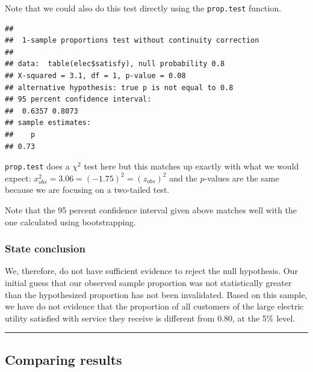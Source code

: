 \documentclass[]{tufte-book}
\newenvironment{Shaded}{\begin{snugshade}}{\end{snugshade}}
\newcommand{\KeywordTok}[1]{\textcolor[rgb]{0.13,0.29,0.53}{\textbf{{#1}}}}
\newcommand{\DataTypeTok}[1]{\textcolor[rgb]{0.13,0.29,0.53}{{#1}}}
\newcommand{\FloatTok}[1]{\textcolor[rgb]{0.00,0.00,0.81}{{#1}}}
\newcommand{\StringTok}[1]{\textcolor[rgb]{0.31,0.60,0.02}{{#1}}}
\newcommand{\OtherTok}[1]{\textcolor[rgb]{0.56,0.35,0.01}{{#1}}}
\newcommand{\NormalTok}[1]{{#1}}
\let\oldrule=\rule
\renewcommand{\rule}[1]{\oldrule{\linewidth}}
\begin{document}
Note that we could also do this test directly using the
\texttt{prop.test} function.

\begin{Shaded}
\end{Shaded}

\begin{verbatim}
## 
##  1-sample proportions test without continuity correction
## 
## data:  table(elec$satisfy), null probability 0.8
## X-squared = 3.1, df = 1, p-value = 0.08
## alternative hypothesis: true p is not equal to 0.8
## 95 percent confidence interval:
##  0.6357 0.8073
## sample estimates:
##    p 
## 0.73
\end{verbatim}

\texttt{prop.test} does a \(\chi^2\) test here but this matches up
exactly with what we would expect:
\(x^2_{obs} = 3.06 = (-1.75)^2 = (z_{obs})^2\) and the \(p\)-values are
the same because we are focusing on a two-tailed test.

Note that the 95 percent confidence interval given above matches well
with the one calculated using bootstrapping.

\subsubsection{State conclusion}\label{state-conclusion-1}

We, therefore, do not have sufficient evidence to reject the null
hypothesis. Our initial guess that our observed sample proportion was
not statistically greater than the hypothesized proportion has not been
invalidated. Based on this sample, we have do not evidence that the
proportion of all customers of the large electric utility satisfied with
service they receive is different from 0.80, at the 5\% level.

\begin{center}\rule{0.5\linewidth}{\linethickness}\end{center}

\subsection{Comparing results}\label{comparing-results-1}
\end{document}
